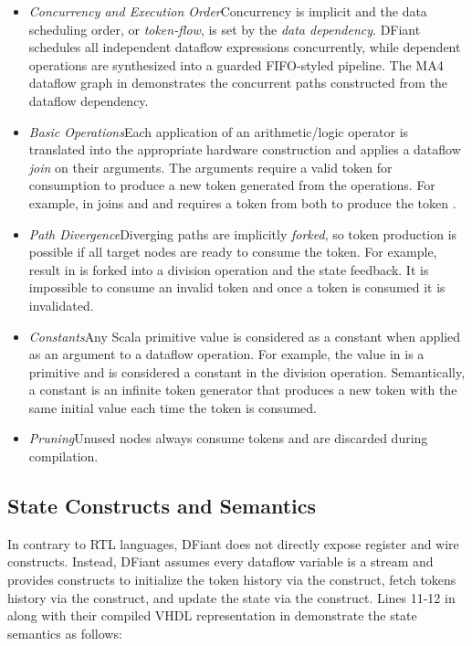 \begin{itemize}[leftmargin=*]
	\item \textit{Concurrency and Execution Order}\quad Concurrency is implicit and the data scheduling order, or \textit{token-flow}, is set by the \textit{data dependency}. DFiant schedules all independent dataflow expressions concurrently, while dependent operations are synthesized into a guarded FIFO-styled pipeline. The MA4 dataflow graph in  demonstrates the concurrent paths constructed from the dataflow dependency. 
	\item \textit{Basic Operations}\quad Each application of an arithmetic/logic operator is translated into the appropriate hardware construction and applies a dataflow \emph{join} on their arguments. The arguments require a valid token for consumption to produce a new token generated from the operations. For example, \code{+} in  joins  and  and requires a token from both to produce the token .
	\item \textit{Path Divergence}\quad Diverging paths are implicitly \emph{forked}, so token production is possible if all target nodes are ready to consume the token. For example,  result in  is forked into a division operation and the state feedback.	It is impossible to consume an invalid token and once a token is consumed it is invalidated.
	\item \textit{Constants}\quad Any Scala primitive value is considered as a constant when applied as an argument to a dataflow operation. For example, the value  in  is a primitive  and is considered a constant in the division operation. Semantically, a constant is an infinite token generator that produces a new token with the same initial value each time the token is consumed.
	\item \textit{Pruning}\quad Unused nodes always consume tokens and are discarded during compilation. 
\end{itemize} 



\subsection{State Constructs and Semantics}
\label{sec:state_constructs}
In contrary to RTL languages, DFiant does not directly expose register and wire constructs. Instead, DFiant assumes every dataflow variable is a stream and provides constructs to initialize the token history via the  construct, fetch tokens history via the  construct, and update the state via the \code{:=} construct. Lines 11-12 in  along with their compiled VHDL representation in  demonstrate the state semantics as follows:

